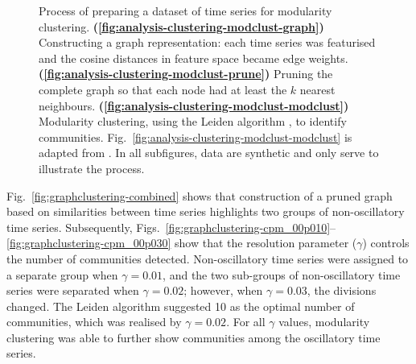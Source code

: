 \begin{figure}
  \caption[
    Process of preparing a dataset of time series for modularity clustering.
  ]{
    Process of preparing a dataset of time series for modularity clustering.
    \textbf{(\ref{fig:analysis-clustering-modclust-graph})}
    Constructing a graph representation: each time series was featurised and the cosine distances in feature space became edge weights.
    \textbf{(\ref{fig:analysis-clustering-modclust-prune})}
    Pruning the complete graph so that each node had at least the $k$ nearest neighbours.
    \textbf{(\ref{fig:analysis-clustering-modclust-modclust})}
    Modularity clustering, using the Leiden algorithm \parencite{traagLouvainLeidenGuaranteeing2019}, to identify communities.
    Fig.\ \ref{fig:analysis-clustering-modclust-modclust} is adapted from \textcite{newmanModularityCommunityStructure2006}.
    In all subfigures, data are synthetic and only serve to illustrate the process.
  }
  \label{fig:analysis-clustering-modclust}
\end{figure}

Fig.\ \ref{fig:graphclustering-combined} shows that construction of a pruned graph based on similarities between time series highlights two groups of non-oscillatory time series.
Subsequently, Figs.\ \ref{fig:graphclustering-cpm_00p010}--\ref{fig:graphclustering-cpm_00p030} show that the resolution parameter ($\gamma$) controls the number of communities detected.
Non-oscillatory time series were assigned to a separate group when $\gamma = 0.01$, and the two sub-groups of non-oscillatory time series were separated when $\gamma = 0.02$; however, when $\gamma = 0.03$, the divisions changed.
The Leiden algorithm \parencite{traagLouvainLeidenGuaranteeing2019} suggested 10 as the optimal number of communities, which was realised by $\gamma = 0.02$.
For all $\gamma$ values, modularity clustering was able to further show communities among the oscillatory time series.

